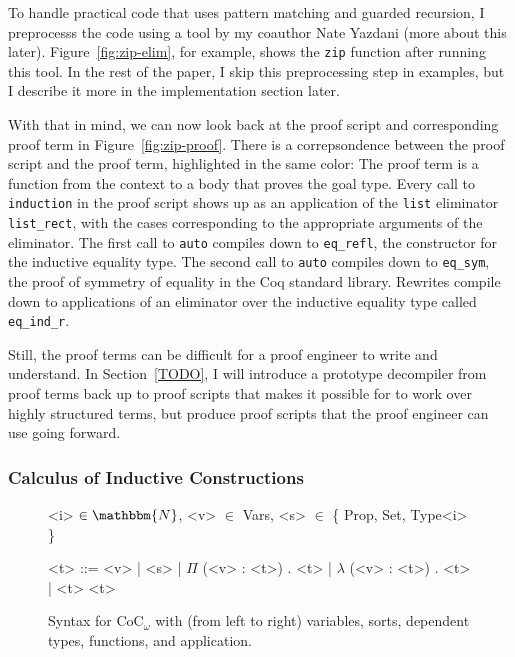 To handle practical code that uses pattern matching and guarded recursion,
I preprocesss the code using a tool by my coauthor Nate Yazdani (more about this later). %
Figure~\ref{fig:zip-elim}, for example, shows the \lstinline{zip} function after running this tool.
In the rest of the paper, I skip this preprocessing step in examples, but I describe it more in the implementation section later.

With that in mind, we can now look back at the proof script and corresponding proof term in Figure~\ref{fig:zip-proof}.
There is a correpsondence between the proof script and the proof term, highlighted in the same color:
The proof term is a function from the context to a body that proves the goal type.
Every call to \lstinline{induction} in the proof script shows up as an application of the \lstinline{list} eliminator 
\lstinline{list_rect}, with the cases corresponding to the appropriate arguments of the eliminator.
The first call to \lstinline{auto} compiles down to \lstinline{eq_refl}, the constructor for the inductive equality type.
The second call to \lstinline{auto} compiles down to \lstinline{eq_sym}, the proof of symmetry of equality in the Coq standard library. %
Rewrites compile down to applications of an eliminator over the inductive equality type called \lstinline{eq_ind_r}.

Still, the proof terms can be difficult for a proof engineer to write and understand.
In Section~\ref{TODO}, I will introduce a prototype decompiler from proof terms back up to proof scripts
that makes it possible for \sysnamelong to work over highly structured  terms,
but produce proof scripts that the proof engineer can use going forward.

\subsubsection{Calculus of Inductive Constructions}
\label{sec:cic}

\begin{figure*}
\small
\begin{grammar}
<i> $\in \mathbbm{N}$, <v> $\in$ Vars, <s> $\in$ \{ Prop, Set, Type<i> \}

<t> ::= <v> \hspace{0.06cm} | \hspace{0.06cm} <s> \hspace{0.06cm} | \hspace{0.06cm} $\Pi$ (<v> : <t>) . <t> \hspace{0.06cm} | \hspace{0.06cm} $\lambda$ (<v> : <t>) . <t> \hspace{0.06cm} | \hspace{0.06cm} <t> <t>
\end{grammar}
\vspace{-0.3cm}
\caption{Syntax for CoC$_\omega$ with (from left to right) variables, sorts, dependent types, functions, and application.}
\label{fig:coc-syntax}
\end{figure*}

